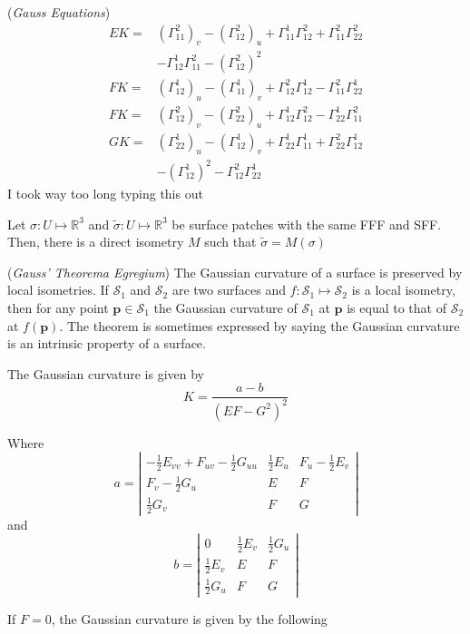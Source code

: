 \documentclass[12pt]{article}
\begin{document}
\begin{multicols*}{2}
(\textit{Gauss Equations})
\[\begin{aligned}
    EK=&(\Gamma_{11}^2)_v - (\Gamma_{12}^2)_u+\Gamma_{11}^1\Gamma_{12}^2+\Gamma_{11}^2\Gamma_{22}^2 \\
     &- \Gamma_{12}^1\Gamma_{11}^2-(\Gamma_{12}^2)^2\\
    FK=&(\Gamma_{12}^1)_u - (\Gamma_{11}^1)_v+\Gamma_{12}^2\Gamma_{12}^1 - \Gamma_{11}^2\Gamma_{22}^1\\
    FK=&(\Gamma_{12}^2)_v - (\Gamma_{22}^2)_u+\Gamma_{12}^1\Gamma_{12}^2 - \Gamma_{22}^1\Gamma_{11}^2\\
    GK=&(\Gamma_{22}^1)_u - (\Gamma_{12}^1)_v+\Gamma_{22}^1\Gamma_{11}^1+\Gamma_{22}^2\Gamma_{12}^1\\
    &-(\Gamma_{12}^1)^2 - \Gamma_{12}^2\Gamma_{22}^1
\end{aligned}\]
I took way too long typing this out

Let $\sigma : U \mapsto \mathbb{R}^3$ and $\tilde{\sigma} : U \mapsto \mathbb{R}^3$ be surface patches with the same FFF and SFF. Then, there is a direct isometry $M$ such that $\tilde{\sigma} = M (\sigma)$

(\textit{Gauss' Theorema Egregium}) The Gaussian curvature of a surface is preserved by local isometries. If $\mathcal{S}_1$ and $\mathcal{S}_2$ are two surfaces and $f : \mathcal{S}_1 \mapsto \mathcal{S}_2$ is a local isometry, then for any point $\mathbf{p}\in \mathcal{S}_1$ the Gaussian curvature of $\mathcal{S}_1$ at $\mathbf{p}$ is equal to that of $\mathcal{S}_2$ at $f(\mathbf{p})$. The theorem is sometimes expressed by saying the Gaussian curvature is an intrinsic property of a surface.

The Gaussian curvature is given by
\[K = \frac{a - b}{(EF - G^2)^2}\]

Where \[a = \left|\begin{array}{ccc}
    -\frac{1}{2}E_{vv}+F_{uv}-\frac{1}{2}G_{uu}&\frac{1}{2}E_u & F_u-\frac{1}{2}E_v\\
    F_v-\frac{1}{2}G_u & E & F\\
    \frac{1}{2}G_v & F & G
\end{array}\right|\] and \[b = \left|\begin{array}{ccc}
    0&\frac{1}{2}E_v & \frac{1}{2}G_u\\
    \frac{1}{2}E_v & E & F\\
    \frac{1}{2}G_u & F & G
\end{array}\right|\]

If $F=0$, the Gaussian curvature is given by the following


\end{multicols*}
\end{document}
